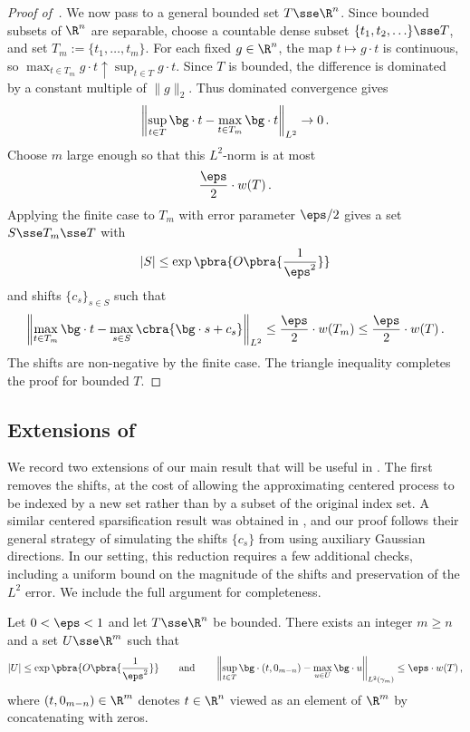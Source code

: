 \documentclass[11pt]{article}
\begin{document}
\begin{proof}[Proof of~]
	We now pass to a general bounded set $T\sse\R^n$. 
	Since bounded subsets of $\R^n$ are separable, choose a countable dense subset $\{t_1,t_2,\ldots\}\sse T$, and set $T_m:=\{t_1,\ldots,t_m\}$.
	For each fixed $g\in\R^n$, the map $t\mapsto g\cdot t$ is continuous, so
	$
		\max_{t\in T_m}g\cdot t
		\uparrow
		\sup_{t\in T}g\cdot t
	$.
	Since $T$ is bounded, the difference is dominated by a constant multiple of $\|g\|_2$.
	Thus dominated convergence gives
	\[
		\left\|
		\sup_{t\in T}\bg\cdot t-\max_{t\in T_m}\bg\cdot t
		\right\|_{L^2}
		\to 0\,.
	\]
	Choose $m$ large enough so that this $L^2$-norm is at most
	\[
		\frac{\eps}{2}
		\cdot
		w(T)\,.
	\]
	Applying the finite case to $T_m$ with error parameter $\eps/2$ gives a set $S\sse T_m\sse T$ with
	\[
		|S|\leq \exp\pbra{O\pbra{\frac{1}{\eps^2}}}
	\]
	and shifts $\{c_s\}_{s\in S}$ such that
	\[
		\left\|
		\max_{t\in T_m}\bg\cdot t
		-
		\max_{s\in S}\cbra{\bg\cdot s+c_s}
		\right\|_{L^2}
		\leq
		\frac{\eps}{2}
		\cdot
		w(T_m)
		\leq
		\frac{\eps}{2}
		\cdot
		w(T)\,.
	\]
	The shifts are non-negative by the finite case.
	The triangle inequality completes the proof for bounded $T$.
\end{proof}

\subsection{Extensions of }

We record two extensions of our main result that will be useful in . 
The first removes the shifts, at the cost of allowing the approximating centered process to be indexed by a new set rather than by a subset of the original index set. 
A similar centered sparsification result was obtained in \cite[Corollary~23]{de2026sparsifying}, and our proof follows their general strategy of simulating the shifts $\{c_s\}$ from  using auxiliary Gaussian directions. 
In our setting, this reduction requires a few additional checks, including a uniform bound on the magnitude of the shifts and preservation of the $L^2$ error.  
We include the full argument for completeness. 

\begin{corollary}
	\label{cor:centered-sparsification}
	Let $0<\eps<1$ and let $T\sse\R^n$ be bounded.  
	There exists an integer $m\geq n$ and a set $U\sse\R^m$ such that 
	\[
		|U|
		\leq
		\exp\pbra{O\pbra{\frac1{\eps^2}}}
		\qquad\text{and}\qquad 
		\left\|
			\sup_{t\in T}\bg\cdot (t,0_{m-n})
			-
			\max_{u\in U}\bg\cdot u
		\right\|_{L^2(\gamma_m)}
		\leq
		\eps \cdot w(T)\,, 
	\]
	where $(t, 0_{m-n}) \in \R^m$ denotes $t \in \R^n$ viewed as an element of $\R^m$ by concatenating with zeros. 
\end{corollary}  
\end{document}
